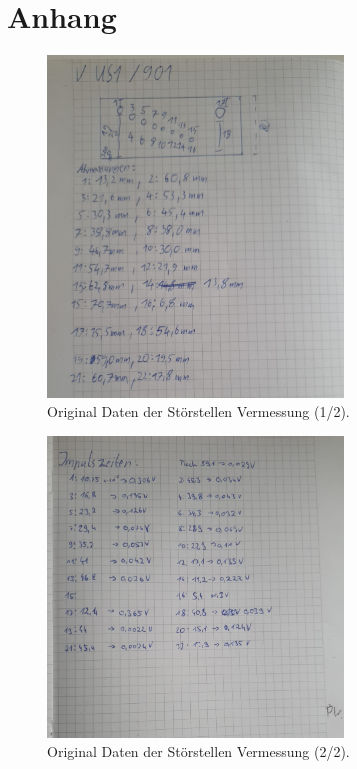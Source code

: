 \section{Anhang}

    \begin{figure}[h]
        \centering
        \includegraphics[width=0.7\textwidth]{latex/images/Original_Daten_1.jpeg}
        \caption{Original Daten der Störstellen Vermessung (1/2).}
    \end{figure}

    \begin{figure}[h]
        \centering
        \includegraphics[width=0.7\textwidth]{latex/images/Original_Daten_2.jpeg}
        \caption{Original Daten der Störstellen Vermessung (2/2).}
    \end{figure}
